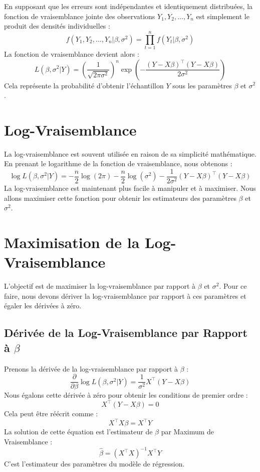 \documentclass[14pt]{extarticle} %
\begin{document}
En supposant que les erreurs sont indépendantes et identiquement distribuées, la fonction de vraisemblance jointe des observations \(Y_1, Y_2, \dots, Y_n\) est simplement le produit des densités individuelles :
\[
f(Y_1, Y_2, \dots, Y_n | \beta, \sigma^2) = \prod_{t=1}^{n} f(Y_t | \beta, \sigma^2)
\]
La fonction de vraisemblance devient alors :
\[
L(\beta, \sigma^2 | Y) = \left(\frac{1}{\sqrt{2\pi \sigma^2}}\right)^n \exp\left( - \frac{(Y - X\beta)^\top (Y - X\beta)}{2\sigma^2} \right)
\]
Cela représente la probabilité d'obtenir l'échantillon \(Y\) sous les paramètres \(\beta\) et \(\sigma^2\).

\section{Log-Vraisemblance}
La log-vraisemblance est souvent utilisée en raison de sa simplicité mathématique. En prenant le logarithme de la fonction de vraisemblance, nous obtenons :
\[
\log L(\beta, \sigma^2 | Y) = -\frac{n}{2} \log(2\pi) - \frac{n}{2} \log(\sigma^2) - \frac{1}{2\sigma^2} (Y - X\beta)^\top (Y - X\beta)
\]
La log-vraisemblance est maintenant plus facile à manipuler et à maximiser. Nous allons maximiser cette fonction pour obtenir les estimateurs des paramètres \(\beta\) et \(\sigma^2\).

\section{Maximisation de la Log-Vraisemblance}
L'objectif est de maximiser la log-vraisemblance par rapport à \(\beta\) et \(\sigma^2\). Pour ce faire, nous devons dériver la log-vraisemblance par rapport à ces paramètres et égaler les dérivées à zéro.

\subsection{Dérivée de la Log-Vraisemblance par Rapport à \(\beta\)}
Prenons la dérivée de la log-vraisemblance par rapport à \(\beta\) :
\[
\frac{\partial}{\partial \beta} \log L(\beta, \sigma^2 | Y) = \frac{1}{\sigma^2} X^\top (Y - X\beta)
\]
Nous égalons cette dérivée à zéro pour obtenir les conditions de premier ordre :
\[
X^\top (Y - X\beta) = 0
\]
Cela peut être réécrit comme :
\[
X^\top X \beta = X^\top Y
\]
La solution de cette équation est l'estimateur de \(\beta\) par Maximum de Vraisemblance :
\[
\hat{\beta} = (X^\top X)^{-1} X^\top Y
\]
C'est l'estimateur des paramètres du modèle de régression.
\end{document}
